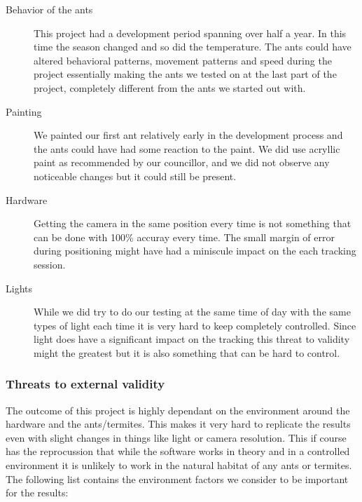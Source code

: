 \begin{description}
\item[Behavior of the ants] This project had a development period spanning over half a year. In this time the season changed and so did the temperature. The ants could have altered behavioral patterns, movement patterns and speed during the project essentially making the ants we tested on at the last part of the project, completely different from the ants we started out with. \\

\item[Painting] We painted our first ant relatively early in the development process and the ants could have had some reaction to the paint. We did use acryllic paint as recommended by our councillor, and we did not observe any noticeable changes but it could still be present. \\

\item[Hardware] Getting the camera in the same position every time is not something that can be done with 100\% accuray every time. The small margin of error during positioning might have had a miniscule impact on the each tracking session. \\

\item[Lights] While we did try to do our testing at the same time of day with the same types of light each time it is very hard to keep completely controlled. Since light does have a significant impact on the tracking this threat to validity might the greatest but it is also something that can be hard to control. \\    
\end{description}

\subsubsection{Threats to external validity} \mbox{}\par

The outcome of this project is highly dependant on the environment around the hardware and the ants/termites. This makes it very hard to replicate the results even with slight changes in things like light or camera resolution. This if course has the reprocussion that while the software works in theory and in a controlled environment it is unlikely to work in the natural habitat of any ants or termites. The following list contains the environment factors we consider to be important for the results:

